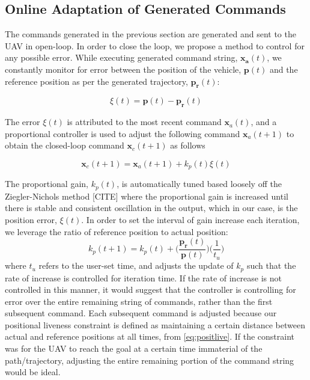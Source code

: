 \documentclass[letterpaper, 10 pt, conference]{ieeeconf}  %
\begin{document}
\subsection{Online Adaptation of Generated Commands}

The commands generated in the previous section are generated and sent to the UAV in open-loop. In order to close the loop, we propose a method to control for any possible error. While executing generated command string, $\mathbf{x_a}(t)$, we constantly monitor for error between the position of the vehicle, $\mathbf{p}(t)$ and the reference position as per the generated trajectory, $\mathbf{p_r}(t)$:

\begin{equation}
    \xi(t) = \mathbf{p}(t)-\mathbf{p_r}(t)
\end{equation}

The error $\xi(t)$ is attributed to the most recent command $\mathbf{x}_a(t)$, and a proportional controller is used to adjust the following command $\mathbf{x}_a(t+1)$ to obtain the closed-loop command $\mathbf{x}_c(t+1)$ as follows

\begin{equation}
    \mathbf{x}_c(t+1) = \mathbf{x}_a(t+1) + k_p(t)\xi(t)
\end{equation}

The proportional gain, $k_p(t)$, is automatically tuned based loosely off the Ziegler-Nichols method [CITE] where the proportional gain is increased until there is stable and consistent oscillation in the output, which in our case, is the position error, $\xi(t)$. In order to set the interval of gain increase each iteration, we leverage the ratio of reference position to actual position:
\begin{equation}
    k_p(t+1) = k_p(t) + \bigg(\frac{\mathbf{p_r}(t)}{\mathbf{p}(t)}\bigg)\bigg(\frac{1}{t_u}\bigg)
\end{equation}
where $t_u$ refers to the user-set time, and adjusts the update of $k_p$ such that the rate of increase is controlled for iteration time. If the rate of increase is not controlled in this manner, it would suggest that the controller is controlling for error over the entire remaining string of commands, rather than the first subsequent command. Each subsequent command is adjusted because our positional liveness constraint is defined as maintaining a certain distance between actual and reference positions at all times, from \eqref{eq:positlive}. If the constraint was for the UAV to reach the goal at a certain time immaterial of the path/trajectory, adjusting the entire remaining portion of the command string would be ideal.
\end{document}
